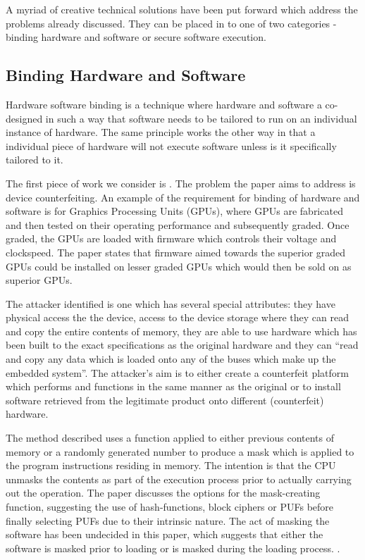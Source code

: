 A myriad of creative technical solutions have been put forward which address the problems already discussed. They can be placed in to one of two categories - binding hardware and software or secure software execution.

\subsection{Binding Hardware and Software}

Hardware software binding is a technique where hardware and software a co-designed in such a way that software needs to be tailored to run on an individual instance of hardware. The same principle works the other way in that a individual piece of hardware will not execute software unless is it specifically tailored to it.


The first piece of work we consider is \cite{Lee2016}. The problem the paper aims to address is device counterfeiting. An example of the requirement for binding of hardware and software is for Graphics Processing Units (GPUs), where GPUs are fabricated and then tested on their operating performance and subsequently graded. Once graded, the GPUs are loaded with firmware which controls their voltage and clockspeed. The paper states that firmware aimed towards the superior graded GPUs could be installed on lesser graded GPUs which would then be sold on as superior GPUs.

The attacker identified is one which has several special attributes: they have physical access the the device, access to the device storage where they can read and copy the entire contents of memory, they are able to use hardware which has been built to the exact specifications as the original hardware and they can ``read and copy any data which is loaded onto any of the buses which make up the embedded system''. The attacker's aim is to either create a counterfeit platform which performs and functions in the same manner as the original or to install software retrieved from the legitimate product onto different (counterfeit) hardware.

The method described uses a function applied to either previous contents of memory or a randomly generated number to produce a mask which is applied to the program instructions residing in memory. The intention is that the CPU unmasks the contents as part of the execution process prior to actually carrying out the operation. The paper discusses the options for the mask-creating function, suggesting the use of hash-functions, block ciphers or PUFs before finally selecting PUFs due to their intrinsic nature. The act of masking the software has been undecided in this paper, which suggests that either the software is masked prior to loading or is masked during the loading process. .


